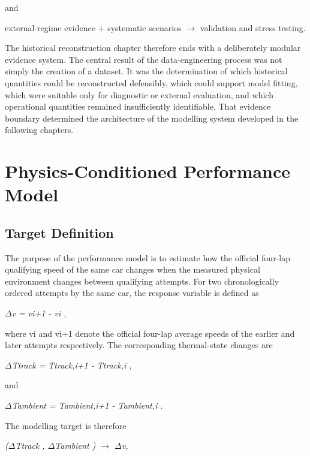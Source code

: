 and

external-regime evidence + systematic scenarios \ensuremath{\rightarrow} validation and stress testing.

The historical reconstruction chapter therefore ends with a deliberately modular evidence system. The central result of the data-engineering process was not simply the creation of a dataset. It was the determination of which historical quantities could be reconstructed defensibly, which could support model fitting, which were suitable only for diagnostic or external evaluation, and which operational quantities remained insufficiently identifiable. That evidence boundary determined the architecture of the modelling system developed in the following chapters.

\section{Physics-Conditioned Performance Model}

\subsection{Target Definition}
The purpose of the performance model is to estimate how the official four-lap qualifying speed of the same car changes when the measured physical environment changes between qualifying attempts. For two chronologically ordered attempts by the same car, the response variable is defined as

\begin{center}\textit{\ensuremath{\Delta}v = vi+1 - vi ,}\end{center}

where vi and vi+1 denote the official four-lap average speeds of the earlier and later attempts respectively. The corresponding thermal-state changes are

\begin{center}\textit{\ensuremath{\Delta}Ttrack = Ttrack,i+1 - Ttrack,i ,}\end{center}

and

\begin{center}\textit{\ensuremath{\Delta}Tambient = Tambient,i+1 - Tambient,i .}\end{center}

The modelling target is therefore

\begin{center}\textit{(\ensuremath{\Delta}Ttrack , \ensuremath{\Delta}Tambient ) \ensuremath{\rightarrow} \ensuremath{\Delta}v,}\end{center}

